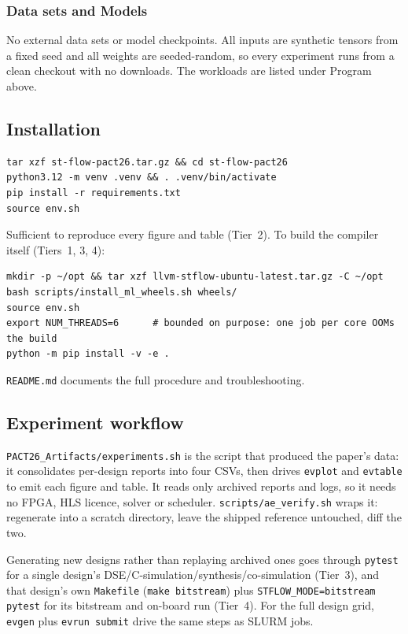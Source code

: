 \subsubsection{Data sets and Models}

No external data sets or model checkpoints. All inputs are synthetic tensors from a
fixed seed and all weights are seeded-random, so every experiment runs from a clean
checkout with no downloads. The workloads are listed under Program above.

\subsection{Installation}

\begin{verbatim}
tar xzf st-flow-pact26.tar.gz && cd st-flow-pact26
python3.12 -m venv .venv && . .venv/bin/activate
pip install -r requirements.txt
source env.sh
\end{verbatim}

Sufficient to reproduce every figure and table (Tier~2). To build the compiler itself
(Tiers~1, 3, 4):

\begin{verbatim}
mkdir -p ~/opt && tar xzf llvm-stflow-ubuntu-latest.tar.gz -C ~/opt
bash scripts/install_ml_wheels.sh wheels/
source env.sh
export NUM_THREADS=6      # bounded on purpose: one job per core OOMs the build
python -m pip install -v -e .
\end{verbatim}

\texttt{README.md} documents the full procedure and troubleshooting.

\subsection{Experiment workflow}

\texttt{PACT26\_Artifacts/experiments.sh} is the script that produced the paper's data:
it consolidates per-design reports into four CSVs, then drives \texttt{evplot} and
\texttt{evtable} to emit each figure and table. It reads only archived reports and logs,
so it needs no FPGA, HLS licence, solver or scheduler. \texttt{scripts/ae\_verify.sh}
wraps it: regenerate into a scratch directory, leave the shipped reference untouched,
diff the two.

Generating new designs rather than replaying archived ones goes through \texttt{pytest}
for a single design's DSE/C-simulation/synthesis/co-simulation (Tier~3), and that
design's own \texttt{Makefile} (\texttt{make bitstream}) plus
\texttt{STFLOW\_MODE=bitstream pytest} for its bitstream and on-board run (Tier~4). For
the full design grid, \texttt{evgen} plus \texttt{evrun submit} drive the same steps as
SLURM jobs.

